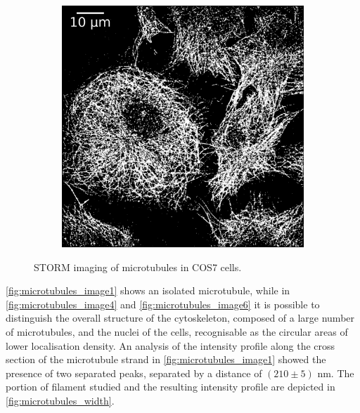 \begin{figure}
\begin{subfigure}{0.32\textwidth}
        \caption{}
        \label{fig:microtubules_image4}
    \end{subfigure}
    \begin{subfigure}{0.32\textwidth}
        \includegraphics[width=\textwidth]{figures/microtubules_image6.png}
        \caption{}
        \label{fig:microtubules_image6}
    \end{subfigure}
    \caption{STORM imaging of microtubules in COS7 cells.}
    \label{fig:microtubules_images}
\end{figure}
%
\autoref{fig:microtubules_image1} shows an isolated microtubule, while in \autoref{fig:microtubules_image4} and \autoref{fig:microtubules_image6} it is possible to distinguish the overall structure of the cytoskeleton, composed of a large number of microtubules, and the nuclei of the cells, recognisable as the circular areas of lower localisation density.
An analysis of the intensity profile along the cross section of the microtubule strand in \autoref{fig:microtubules_image1} showed the presence of two separated peaks, separated by a distance of $(210 \pm 5)$ nm.
The portion of filament studied and the resulting intensity profile are depicted in \autoref{fig:microtubules_width}.
%
